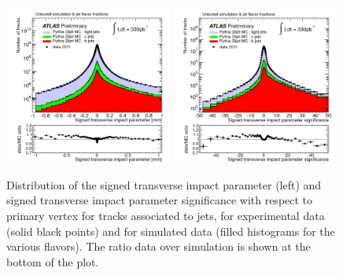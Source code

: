 \begin{figure}[htbp]
  \begin{center}
    \includegraphics[width=0.49\textwidth]{IP.png}
    \includegraphics[width=0.49\textwidth]{IPsignificance.png} 
    \caption{Distribution of the signed transverse impact parameter (left) and signed transverse impact parameter significance with respect to primary vertex for tracks associated to jets, for experimental data (solid black points) and for simulated data (filled histograms for the various flavors). The ratio data over simulation is shown at the bottom of the plot.}
    \label{fig:IPsignificance}
  \end{center}
\end{figure}

